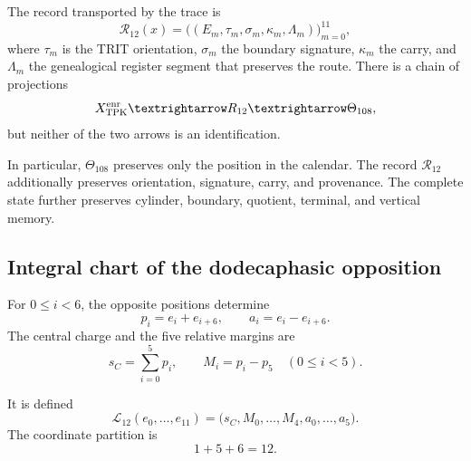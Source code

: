 \begin{definition}
\label{p12-83-c10-s1:def:registro-enriquecido-dodecafasico}
The record transported by the trace is
\[
 \mathcal R_{12}(x)=
 \bigl((E_m,\tau_m,\sigma_m,\kappa_m,\Lambda_m)\bigr)_{m=0}^{11},
\]
where \(\tau_m\) is the TRIT orientation, \(\sigma_m\) the boundary
signature, \(\kappa_m\) the carry, and \(\Lambda_m\) the genealogical register segment
that preserves the route. There is a chain of projections
\[
 \mathcal X_{\rm TPK}^{\rm enr}
 \longrightarrow\mathcal R_{12}
 \longrightarrow\Theta_{108},
\]
but neither of the two arrows is an identification.
\end{definition}

In particular, \(\Theta_{108}\) preserves only the position in the calendar.
The record \(\mathcal R_{12}\) additionally preserves orientation, signature,
carry, and provenance. The complete state further preserves cylinder,
boundary, quotient, terminal, and vertical memory.

\subsection{Integral chart of the dodecaphasic opposition}

For \(0\leq i<6\), the opposite positions determine
\begin{equation}
 p_i=e_i+e_{i+6},
 \qquad
 a_i=e_i-e_{i+6}.
 \label{p12-83-c10-s1:eq:pares-opuestos-registro}
\end{equation}
The central charge and the five relative margins are
\begin{equation}
 s_C=\sum_{i=0}^{5}p_i,
 \qquad
 M_i=p_i-p_5\quad(0\leq i<5).
 \label{p12-83-c10-s1:eq:carga-margenes-registro}
\end{equation}

\begin{definition}
\label{p12-83-c10-s1:def:carta-integral-156}
It is defined
\begin{equation}
 \mathcal L_{12}(e_0,\ldots,e_{11})
 =\bigl(s_C,M_0,\ldots,M_4,a_0,\ldots,a_5\bigr).
 \label{p12-83-c10-s1:eq:carta-integral-156}
\end{equation}
The coordinate partition is
\[
 1+5+6=12.
\]
\end{definition}

